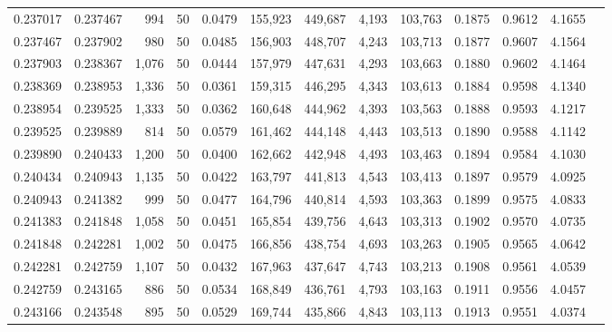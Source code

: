 \begin{tabular}{rrrrrrrrrrrrr}
0.237017 & 0.237467 &   994 &  50 &                                     0.0479 & 155,923 & 449,687 &   4,193 & 103,763 & 0.1875 & 0.9612 & 4.1655 \\
0.237467 & 0.237902 &   980 &  50 &                                     0.0485 & 156,903 & 448,707 &   4,243 & 103,713 & 0.1877 & 0.9607 & 4.1564 \\
0.237903 & 0.238367 & 1,076 &  50 &                                     0.0444 & 157,979 & 447,631 &   4,293 & 103,663 & 0.1880 & 0.9602 & 4.1464 \\
0.238369 & 0.238953 & 1,336 &  50 &                                     0.0361 & 159,315 & 446,295 &   4,343 & 103,613 & 0.1884 & 0.9598 & 4.1340 \\
0.238954 & 0.239525 & 1,333 &  50 &                                     0.0362 & 160,648 & 444,962 &   4,393 & 103,563 & 0.1888 & 0.9593 & 4.1217 \\
0.239525 & 0.239889 &   814 &  50 &                                     0.0579 & 161,462 & 444,148 &   4,443 & 103,513 & 0.1890 & 0.9588 & 4.1142 \\
0.239890 & 0.240433 & 1,200 &  50 &                                     0.0400 & 162,662 & 442,948 &   4,493 & 103,463 & 0.1894 & 0.9584 & 4.1030 \\
0.240434 & 0.240943 & 1,135 &  50 &                                     0.0422 & 163,797 & 441,813 &   4,543 & 103,413 & 0.1897 & 0.9579 & 4.0925 \\
0.240943 & 0.241382 &   999 &  50 &                                     0.0477 & 164,796 & 440,814 &   4,593 & 103,363 & 0.1899 & 0.9575 & 4.0833 \\
0.241383 & 0.241848 & 1,058 &  50 &                                     0.0451 & 165,854 & 439,756 &   4,643 & 103,313 & 0.1902 & 0.9570 & 4.0735 \\
0.241848 & 0.242281 & 1,002 &  50 &                                     0.0475 & 166,856 & 438,754 &   4,693 & 103,263 & 0.1905 & 0.9565 & 4.0642 \\
0.242281 & 0.242759 & 1,107 &  50 &                                     0.0432 & 167,963 & 437,647 &   4,743 & 103,213 & 0.1908 & 0.9561 & 4.0539 \\
0.242759 & 0.243165 &   886 &  50 &                                     0.0534 & 168,849 & 436,761 &   4,793 & 103,163 & 0.1911 & 0.9556 & 4.0457 \\
0.243166 & 0.243548 &   895 &  50 &                                     0.0529 & 169,744 & 435,866 &   4,843 & 103,113 & 0.1913 & 0.9551 & 4.0374 \\

\end{tabular}
